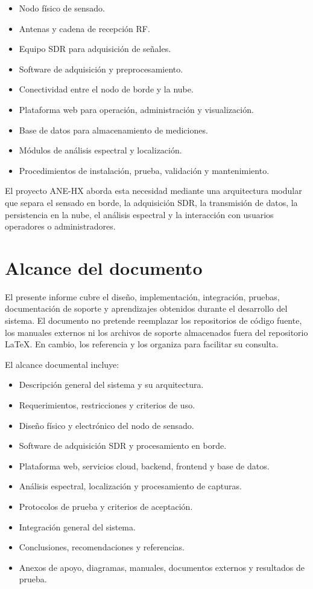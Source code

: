\begin{itemize}[leftmargin=*]
    \item Nodo físico de sensado.
    \item Antenas y cadena de recepción RF.
    \item Equipo SDR para adquisición de señales.
    \item Software de adquisición y preprocesamiento.
    \item Conectividad entre el nodo de borde y la nube.
    \item Plataforma web para operación, administración y visualización.
    \item Base de datos para almacenamiento de mediciones.
    \item Módulos de análisis espectral y localización.
    \item Procedimientos de instalación, prueba, validación y mantenimiento.
\end{itemize}

El proyecto ANE-HX aborda esta necesidad mediante una arquitectura modular que separa el sensado en borde, la adquisición SDR, la transmisión de datos, la persistencia en la nube, el análisis espectral y la interacción con usuarios operadores o administradores.

\section{Alcance del documento}

El presente informe cubre el diseño, implementación, integración, pruebas, documentación de soporte y aprendizajes obtenidos durante el desarrollo del sistema. El documento no pretende reemplazar los repositorios de código fuente, los manuales externos ni los archivos de soporte almacenados fuera del repositorio \LaTeX. En cambio, los referencia y los organiza para facilitar su consulta.

El alcance documental incluye:

\begin{itemize}[leftmargin=*]
    \item Descripción general del sistema y su arquitectura.
    \item Requerimientos, restricciones y criterios de uso.
    \item Diseño físico y electrónico del nodo de sensado.
    \item Software de adquisición SDR y procesamiento en borde.
    \item Plataforma web, servicios cloud, backend, frontend y base de datos.
    \item Análisis espectral, localización y procesamiento de capturas.
    \item Protocolos de prueba y criterios de aceptación.
    \item Integración general del sistema.
    \item Conclusiones, recomendaciones y referencias.
    \item Anexos de apoyo, diagramas, manuales, documentos externos y resultados de prueba.
\end{itemize}

